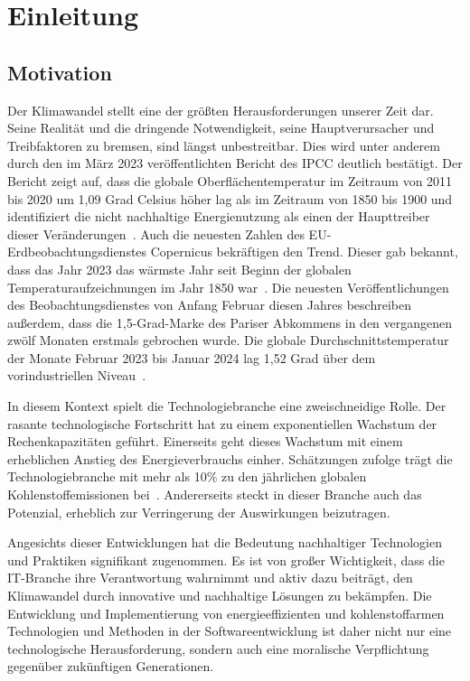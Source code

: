 \chapter{Einleitung}

\section{Motivation}
Der Klimawandel stellt eine der größten Herausforderungen unserer Zeit dar.
Seine Realität und die dringende Notwendigkeit, seine Hauptverursacher und Treibfaktoren zu bremsen, sind längst unbestreitbar.
Dies wird unter anderem durch den im März 2023 veröffentlichten Bericht des \ac{IPCC} deutlich bestätigt.
Der Bericht zeigt auf, dass die globale Oberflächentemperatur im Zeitraum von 2011 bis 2020 um 1,09 Grad Celsius höher lag als im Zeitraum von 1850 bis 1900 und identifiziert die nicht nachhaltige Energienutzung als einen der Haupttreiber dieser Veränderungen~\cite{IPCC.2023}.
Auch die neuesten Zahlen des EU-Erdbeobachtungsdienstes Copernicus bekräftigen den Trend.
Dieser gab bekannt, dass das Jahr 2023 das wärmste Jahr seit Beginn der globalen Temperaturaufzeichnungen im Jahr 1850 war~\cite{CopernicusClimateChangeService.09.01.2024}.
Die neuesten Veröffentlichungen des Beobachtungsdienstes von Anfang Februar diesen Jahres beschreiben außerdem, dass die 1,5-Grad-Marke des Pariser Abkommens in den vergangenen zwölf Monaten erstmals gebrochen wurde.
Die globale Durchschnittstemperatur der Monate Februar 2023 bis Januar 2024 lag 1,52 Grad über dem vorindustriellen Niveau~\cite{Eichhorn.8.2.2024}.

In diesem Kontext spielt die Technologiebranche eine zweischneidige Rolle.
Der rasante technologische Fortschritt hat zu einem exponentiellen Wachstum der Rechenkapazitäten geführt.
Einerseits geht dieses Wachstum mit einem erheblichen Anstieg des Energieverbrauchs einher.
Schätzungen zufolge trägt die Technologiebranche mit mehr als 10\% zu den jährlichen globalen Kohlenstoffemissionen bei~\cite{Buchanan.2023}.
Andererseits steckt in dieser Branche auch das Potenzial, erheblich zur Verringerung der Auswirkungen beizutragen.

Angesichts dieser Entwicklungen hat die Bedeutung nachhaltiger Technologien und Praktiken signifikant zugenommen.
Es ist von großer Wichtigkeit, dass die \ac{IT}-Branche ihre Verantwortung wahrnimmt und aktiv dazu beiträgt, den Klimawandel durch innovative und nachhaltige Lösungen zu bekämpfen.
Die Entwicklung und Implementierung von energieeffizienten und kohlenstoffarmen Technologien und Methoden in der Softwareentwicklung ist daher nicht nur eine technologische Herausforderung, sondern auch eine moralische Verpflichtung gegenüber zukünftigen Generationen.

